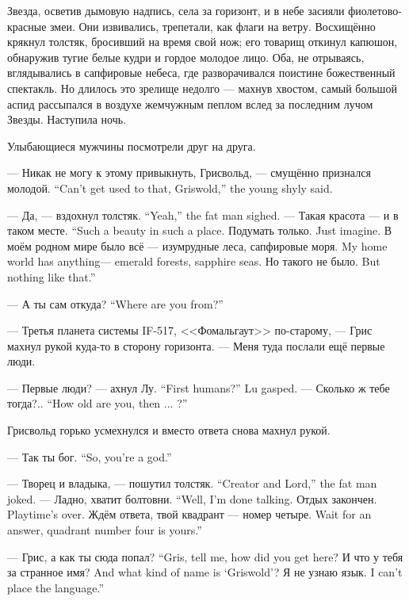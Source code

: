 Звезда, осветив дымовую надпись, села за горизонт, и в небе засияли фиолетово-красные змеи.
Они извивались, трепетали, как флаги на ветру.
Восхищённо крякнул толстяк, бросивший на время свой нож;
его товарищ откинул капюшон, обнаружив тугие белые кудри и гордое молодое лицо.
Оба, не отрываясь, вглядывались в сапфировые небеса, где разворачивался поистине божественный спектакль.
Но длилось это зрелище недолго --- махнув хвостом, самый большой аспид рассыпался в воздухе жемчужным пеплом вслед за последним лучом Звезды.
Наступила ночь.

Улыбающиеся мужчины посмотрели друг на друга.

{--- Никак не могу к этому привыкнуть, Грисвольд, --- смущённо признался молодой.}
{``Can't get used to that, Griswold,'' the young shyly said.}

{--- Да, --- вздохнул толстяк.}
{``Yeah,'' the fat man sighed.}
{--- Такая красота --- и в таком месте.}
{``Such a beauty in such a place.}
{Подумать только.}
{Just imagine.}
{В моём родном мире было всё --- изумрудные леса, сапфировые моря.}
{My home world has anything--- emerald forests, sapphire seas.}
{Но такого не было.}
{But nothing like that.''}

{--- А ты сам откуда?}
{``Where are you from?''}

--- Третья планета системы IF-517, <<Фомальгаут>> по-старому, --- Грис махнул рукой куда-то в сторону горизонта.
--- Меня туда послали ещё первые люди.

{--- Первые люди? --- ахнул Лу.}
{``First humans?'' Lu gasped.}
{--- Сколько ж тебе тогда?..}
{``How old are you, then ... ?''}

Грисвольд горько усмехнулся и вместо ответа снова махнул рукой.

{--- Так ты бог.}
{``So, you're a god.''}

{--- Творец и владыка, --- пошутил толстяк.}
{``Creator and Lord,'' the fat man joked.}
{--- Ладно, хватит болтовни.}
{``Well, I'm done talking.}
{Отдых закончен.}
{Playtime's over.}
{Ждём ответа, твой квадрант --- номер четыре.}
{Wait for an answer, quadrant number four is yours.''}

{--- Грис, а как ты сюда попал?}
{``Gris, tell me, how did you get here?}
{И что у тебя за странное имя?}
{And what kind of name is `Griswold'?}
{Я не узнаю язык.}
{I can't place the language.''}

